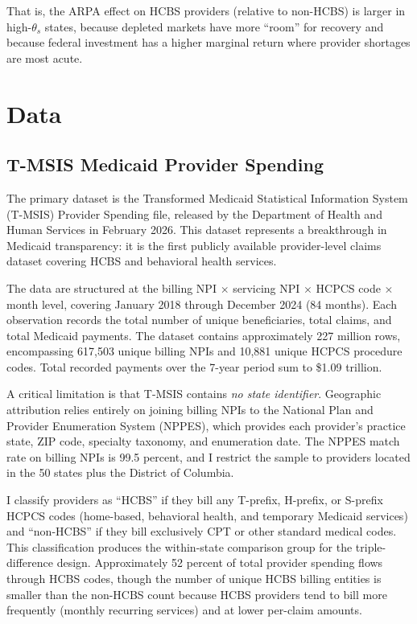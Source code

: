 \documentclass[12pt]{article}
\begin{document}
That is, the ARPA effect on HCBS providers (relative to non-HCBS) is larger in high-$\theta_s$ states, because depleted markets have more ``room'' for recovery and because federal investment has a higher marginal return where provider shortages are most acute.


\section{Data}

\subsection{T-MSIS Medicaid Provider Spending}

The primary dataset is the Transformed Medicaid Statistical Information System (T-MSIS) Provider Spending file, released by the Department of Health and Human Services in February 2026. This dataset represents a breakthrough in Medicaid transparency: it is the first publicly available provider-level claims dataset covering HCBS and behavioral health services.

The data are structured at the billing NPI $\times$ servicing NPI $\times$ HCPCS code $\times$ month level, covering January 2018 through December 2024 (84 months). Each observation records the total number of unique beneficiaries, total claims, and total Medicaid payments. The dataset contains approximately 227 million rows, encompassing 617,503 unique billing NPIs and 10,881 unique HCPCS procedure codes. Total recorded payments over the 7-year period sum to \$1.09 trillion.

A critical limitation is that T-MSIS contains \emph{no state identifier}. Geographic attribution relies entirely on joining billing NPIs to the National Plan and Provider Enumeration System (NPPES), which provides each provider's practice state, ZIP code, specialty taxonomy, and enumeration date. The NPPES match rate on billing NPIs is 99.5 percent, and I restrict the sample to providers located in the 50 states plus the District of Columbia.

I classify providers as ``HCBS'' if they bill any T-prefix, H-prefix, or S-prefix HCPCS codes (home-based, behavioral health, and temporary Medicaid services) and ``non-HCBS'' if they bill exclusively CPT or other standard medical codes. This classification produces the within-state comparison group for the triple-difference design. Approximately 52 percent of total provider spending flows through HCBS codes, though the number of unique HCBS billing entities is smaller than the non-HCBS count because HCBS providers tend to bill more frequently (monthly recurring services) and at lower per-claim amounts.
\end{document}
